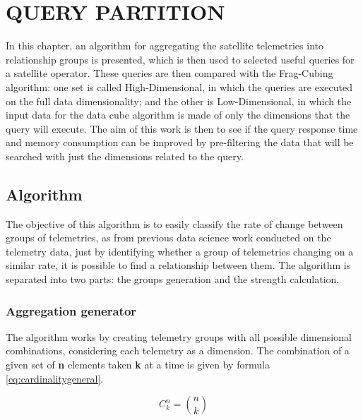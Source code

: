 
\chapter{QUERY PARTITION}\label{ch:querypart}

In this chapter, an algorithm for aggregating the satellite telemetries into relationship groups is presented, which is then used to selected useful queries for a satellite operator.
These queries are then compared with the Frag-Cubing algorithm: one set is called High-Dimensional, in which the queries are executed on the full data dimensionality; and the other is Low-Dimensional, in which the input data for the data cube algorithm is made of only the dimensions that the query will execute.
The aim of this work is then to see if the query response time and memory consumption can be improved by pre-filtering the data that will be searched with just the dimensions related to the query.

\section{Algorithm}\label{ch:querypart:heur}

The objective of this algorithm is to easily classify the rate of change between groups of telemetries, as from previous data science work conducted on the telemetry data, just by identifying whether a group of telemetries changing on a similar rate, it is possible to find a relationship between them.
The algorithm is separated into two parts: the groups generation and the strength calculation.

\hypertarget{aggregation-generator}{%
\subsection{Aggregation generator}\label{ch:querypart:heur:agg}}

The algorithm works by creating telemetry groups with all possible dimensional combinations, considering each telemetry as a dimension.
The combination of a given set of \textbf{n} elements taken \textbf{k} at a time is given by formula \ref{eq:cardinalitygeneral}.

\begin{equation} \label{eq:cardinalitygeneral}
C_k^n = \binom{n}{k}
\end{equation}

